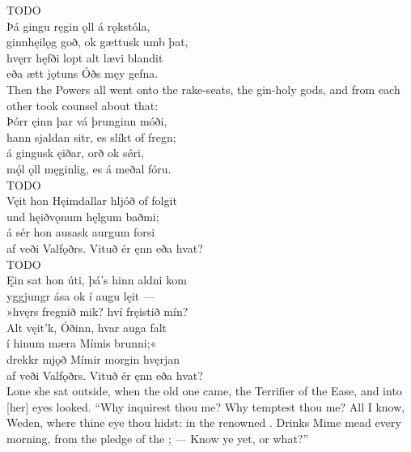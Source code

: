 \bvb TODO\\%

\bva Þá gingu ręgin ǫll \hld á rǫkstóla, \\%
ginnhęilǫg goð, \hld ok gættusk umb þat, \\%
hvęrr hęfði lopt alt \hld lævi blandit \\%
eða ætt jǫtuns \hld Óðs męy gefna.\\%

\bvb Then the Powers all went onto the rake-seats, the gin-holy gods, and from each other took counsel about that:\\%

\bva Þórr ęinn þar vá \hld þrunginn móði, \\%
hann sjaldan sitr, \hld es slíkt of fregn; \\%
á gingusk ęiðar, \hld orð ok sǿri, \\%
mǫ́l ǫll męginlig, \hld es á meðal fóru.\\%

\bvb TODO\\%

\bva Vęit hon Hęimdallar \hld hljóð of folgit \\%
und hęiðvǫnum \hld hęlgum baðmi; \\%
á sér hon ausask \hld aurgum forsi \\%
af veði Valfǫðrs. \hld Vituð ér ęnn eða hvat?\\%

\bvb TODO\\%

\bva Ęin sat hon úti, \hld þá’s hinn aldni kom \\%
yggjungr ása \hld ok í augu lęit — \\%
»hvęrs fregnið mik? \hld hví fręistið mín? \\%
Alt vęit’k, Óðinn, \hld hvar auga falt \\%
í hinum mæra \hld Mímis brunni;« \\%
drekkr mjǫð Mímir \hld morgin hvęrjan \\%
af veði Valfǫðrs. \hld Vituð ér ęnn eða hvat?\\%

\bvb Lone she sat outside, when the old one came, the Terrifier of the Ease, and into [her] eyes looked. “Why inquirest thou me? Why temptest thou me? All I know, Weden, where thine eye thou hidst: in the renowned . Drinks Mime mead every morning, from the pledge of the ; — Know ye yet, or what?”\\%

